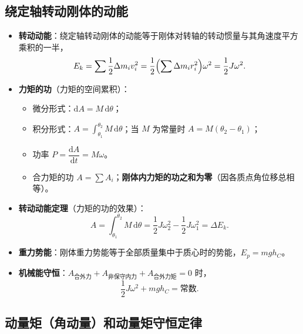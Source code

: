 \documentclass[12pt,a4paper]{ctexart}
\begin{document}
\subsection{绕定轴转动刚体的动能}

\begin{itemize}
    \item \textbf{转动动能}：绕定轴转动刚体的动能等于刚体对转轴的转动惯量与其角速度平方乘积的一半，
    \[
        E_k = \sum \frac{1}{2}\Delta m_i v_i^2 = \frac{1}{2}\Bigl(\sum \Delta m_i r_i^2\Bigr)\omega^2 = \frac{1}{2}J\omega^2.
    \]
    \item \textbf{力矩的功}（力矩的空间累积）：
    \begin{itemize}
        \item 微分形式：$\mathrm{d}A = M\,\mathrm{d}\theta$；
        \item 积分形式：$A = \displaystyle\int_{\theta_1}^{\theta_2} M\,\mathrm{d}\theta$；当 $M$ 为常量时 $A = M(\theta_2-\theta_1)$；
        \item 功率 $P = \dfrac{\mathrm{d}A}{\mathrm{d}t} = M\omega$。
        \item 合力矩的功 $A = \sum A_i$；\textbf{刚体内力矩的功之和为零}（因各质点角位移总相等）。
    \end{itemize}
    \item \textbf{转动动能定理}（力矩的功的效果）：
    \[
        A = \int_{\theta_1}^{\theta_2}M\,\mathrm{d}\theta = \frac{1}{2}J\omega_2^2 - \frac{1}{2}J\omega_1^2 = \Delta E_k.
    \]
    \item \textbf{重力势能}：刚体重力势能等于全部质量集中于质心时的势能，$E_p = mgh_C$。
    \item \textbf{机械能守恒}：$A_{\text{合外力}}+A_{\text{非保守内力}}+A_{\text{合外力矩}}=0$ 时，
    \[
        \frac{1}{2}J\omega^2 + mgh_C = \text{常数}.
    \]
\end{itemize}

\subsection{动量矩（角动量）和动量矩守恒定律}
\end{document}

